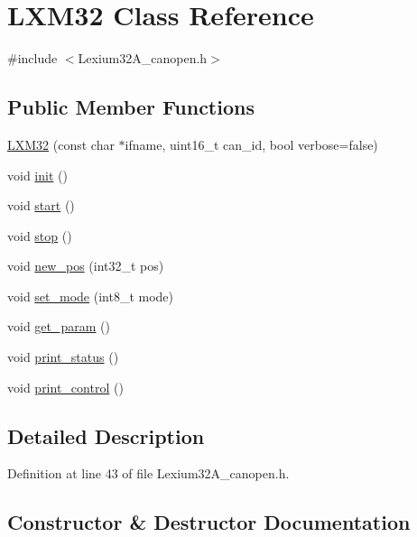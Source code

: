 \hypertarget{class_l_x_m32}{}\section{L\+X\+M32 Class Reference}
\label{class_l_x_m32}


{\ttfamily \#include $<$Lexium32\+A\+\_\+canopen.\+h$>$}

\subsection*{Public Member Functions}
\begin{DoxyCompactItemize}
\item 
\hyperlink{class_l_x_m32_aa4a3e84b72c79b4d47e9f842a8977f98}{L\+X\+M32} (const char $\ast$ifname, uint16\+\_\+t can\+\_\+id, bool verbose=false)
\item 
void \hyperlink{class_l_x_m32_a3d325b9b19432dc05240ccfc328363d9}{init} ()
\item 
void \hyperlink{class_l_x_m32_a53198cf491d6b00d698bac5a55bbe5d4}{start} ()
\item 
void \hyperlink{class_l_x_m32_a73364111a5c2be2d60b7456704f7b9a8}{stop} ()
\item 
void \hyperlink{class_l_x_m32_a3b470e3d484fc0fb2a208df10a8e29e7}{new\+\_\+pos} (int32\+\_\+t pos)
\item 
void \hyperlink{class_l_x_m32_a4087402e009dd3be18765caac410d412}{set\+\_\+mode} (int8\+\_\+t mode)
\item 
void \hyperlink{class_l_x_m32_aa36cd9154a11f3388715fa2f482c37ca}{get\+\_\+param} ()
\item 
void \hyperlink{class_l_x_m32_a201d8f9da28994a92612e2618b7a1167}{print\+\_\+status} ()
\item 
void \hyperlink{class_l_x_m32_a545b23fab3528a8039bb2cc62808f9f5}{print\+\_\+control} ()
\end{DoxyCompactItemize}


\subsection{Detailed Description}


Definition at line 43 of file Lexium32\+A\+\_\+canopen.\+h.



\subsection{Constructor \& Destructor Documentation}
\mbox{\label{class_l_x_m32_aa4a3e84b72c79b4d47e9f842a8977f98}} 
